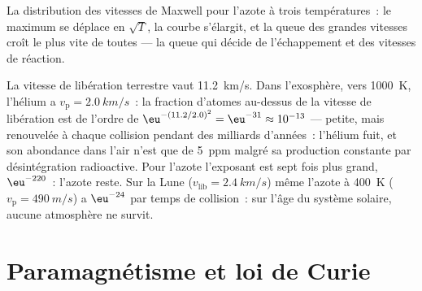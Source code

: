 \begin{omfigure}

{\small La distribution des vitesses de Maxwell pour l'azote à trois
températures~: le maximum se déplace en $\sqrt T$, la courbe s'élargit, et la
queue des grandes vitesses croît le plus vite de toutes --- la queue qui décide de l'échappement
et des vitesses de réaction.}
\end{omfigure}

\begin{example}\label{ex:b2:boltzmann-factor:escape}
La vitesse de libération terrestre vaut \qty{11.2}{km/s}. Dans l'exosphère, vers
\qty{1000}{K}, l'hélium a $v_{\text{p}} = \qty{2.0}{km/s}$~: la fraction
d'atomes au-dessus de la vitesse de libération est de l'ordre de $\eu^{-(11.2/2.0)^2} = \eu^{-31}
\approx 10^{-13}$ --- petite, mais renouvelée à chaque collision pendant des milliards
d'années~: l'hélium fuit, et son abondance dans l'air n'est que de
\qty{5}{ppm} malgré sa production constante par désintégration radioactive. Pour
l'azote l'exposant est sept fois plus grand, $\eu^{-220}$~: l'azote reste.
Sur la Lune ($v_{\text{lib}} = \qty{2.4}{km/s}$) même l'azote à
\qty{400}{K} ($v_{\text{p}} = \qty{490}{m/s}$) a $\eu^{-24}$ par temps de collision~:
sur l'âge du système solaire, aucune atmosphère ne survit.
\end{example}

\section{Paramagnétisme et loi de Curie}

